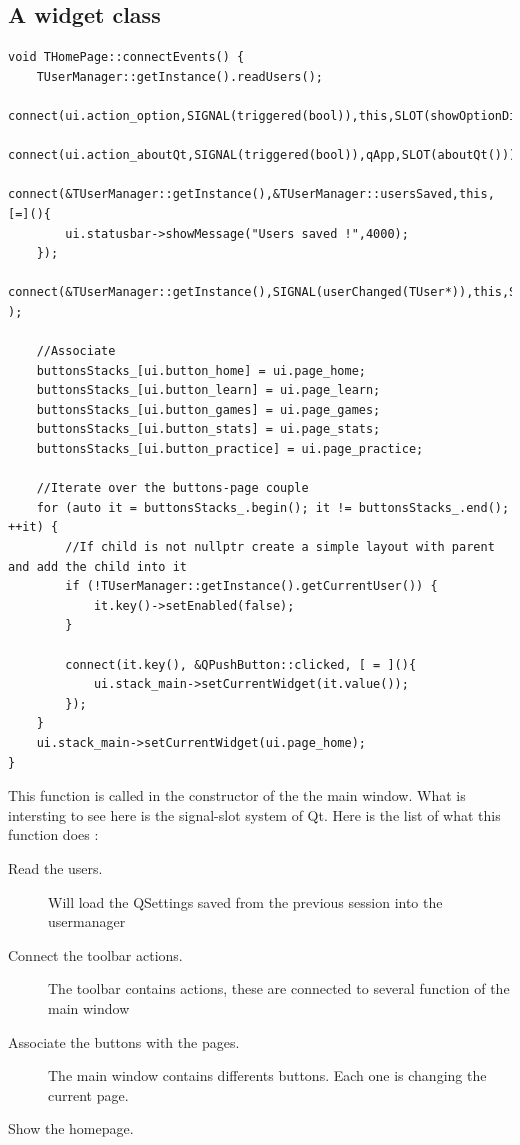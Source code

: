 \subsection{A widget class}
\begin{lstlisting}
void THomePage::connectEvents() {
    TUserManager::getInstance().readUsers();
    connect(ui.action_option,SIGNAL(triggered(bool)),this,SLOT(showOptionDialog()));
    connect(ui.action_aboutQt,SIGNAL(triggered(bool)),qApp,SLOT(aboutQt()));
    connect(&TUserManager::getInstance(),&TUserManager::usersSaved,this,[=](){
        ui.statusbar->showMessage("Users saved !",4000);
    });
    connect(&TUserManager::getInstance(),SIGNAL(userChanged(TUser*)),this,SLOT(updateUI(TUser*)) );

	//Associate 
    buttonsStacks_[ui.button_home] = ui.page_home;
    buttonsStacks_[ui.button_learn] = ui.page_learn;
    buttonsStacks_[ui.button_games] = ui.page_games;
    buttonsStacks_[ui.button_stats] = ui.page_stats;
    buttonsStacks_[ui.button_practice] = ui.page_practice;

    //Iterate over the buttons-page couple
    for (auto it = buttonsStacks_.begin(); it != buttonsStacks_.end(); ++it) {
        //If child is not nullptr create a simple layout with parent and add the child into it
        if (!TUserManager::getInstance().getCurrentUser()) {
            it.key()->setEnabled(false);
        }

        connect(it.key(), &QPushButton::clicked, [ = ](){
            ui.stack_main->setCurrentWidget(it.value());
        });
    }
    ui.stack_main->setCurrentWidget(ui.page_home);
}
\end{lstlisting}
This function is called in the constructor of the the main window. What is intersting to see here is the signal-slot system of Qt.
Here is the list of what this function does :
\begin{description}
	\item[Read the users.] Will load the QSettings saved from the previous session into the usermanager
	\item[Connect the toolbar actions.] The toolbar contains actions, these are connected to several function of the main window
	\item[Associate the buttons with the pages.] The main window contains differents buttons. Each one is changing the current page.
	\item[Show the homepage.]
\end{description}

